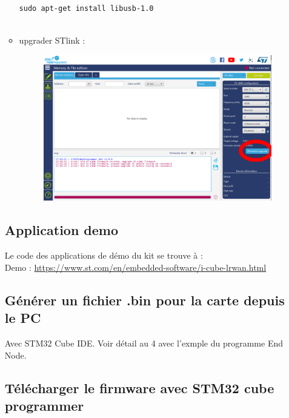 \documentclass{article}
\begin{document}
\begin{itemize}
\begin{itemize}
\begin{verbatim}


sudo apt-get install libusb-1.0


\end{verbatim}

\item  upgrader STlink :

\begin{figure}[H]
\begin{center}
\advance\leftskip-3cm
\advance\rightskip-3cm
\includegraphics[keepaspectratio=true,scale=0.3]{stlink_upgrade.png}
\label{visina8}
\end{center}\end{figure}



\end{itemize}


\subsection{Application demo}
Le code des applications de démo du kit se trouve à : \\
Demo : \url{https://www.st.com/en/embedded-software/i-cube-lrwan.html}


\subsection{Générer un fichier .bin pour la carte depuis le PC}
Avec STM32 Cube IDE. Voir détail au 4 avec l'exmple du programme End Node.



\subsection{Télécharger le firmware avec STM32 cube programmer}


\end{itemize}
\end{document}
